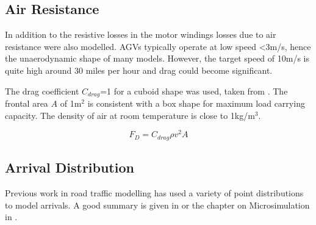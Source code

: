 \documentclass[]{article}
\begin{document}
\subsection{Air Resistance}
In addition to the resistive losses in the motor windings losses due to air resistance were also modelled. AGVs  typically operate at low speed <3m/s, hence the unaerodynamic shape of many models. However, the target speed of 10m/s is quite high around 30 miles per hour and drag could become significant. 

The drag coefficient $C_{drag}$=1 for a cuboid shape was used, taken from \cite{Toolbox2004}. The frontal area $A$ of 1m$^2$ is consistent with a box shape for maximum load carrying capacity. The density of air at room temperature is close to 1kg/m$^3$.

\begin{equation}
	F_D = C_{drag} \rho v^2 A
\end{equation} 


\subsection{Arrival Distribution}
Previous work in road traffic modelling has used a variety of point distributions to model arrivals. A good summary is given in \cite{Knoop2020} or the chapter on Microsimulation in \cite{Sheffi1985}. 
\end{document}
